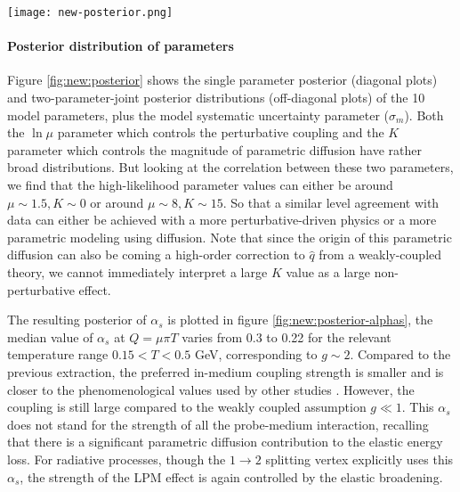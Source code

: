 \begin{figure*}
\centering
\texttt{[image: new-posterior.png]}
\caption[The single-parameter posterior distributions (diagonal plots) and]{The single-parameter posterior distributions (diagonal plots) and two-parameter joint posterior distributions (off-diagonal plots).}
\label{fig:new:posterior}
\end{figure*}

\paragraph{Posterior distribution of parameters} Figure \ref{fig:new:posterior} shows the single parameter posterior (diagonal plots) and two-parameter-joint posterior distributions (off-diagonal plots) of the 10 model parameters, plus the model systematic uncertainty parameter ($\sigma_m$).
Both the $\ln\mu$ parameter which controls the perturbative coupling and the $K$ parameter which controls the magnitude of parametric diffusion have rather broad distributions.
But looking at the correlation between these two parameters, we find that the high-likelihood parameter values can either be around $\mu\sim 1.5, K\sim 0$ or around $\mu\sim 8, K\sim 15$.
So that a similar level agreement with data can either be achieved with a more perturbative-driven physics or a more parametric modeling using diffusion.
Note that since the origin of this parametric diffusion can also be coming a high-order correction to $\hat{q}$ from a weakly-coupled theory, we cannot immediately interpret a large $K$ value as a large non-perturbative effect.

The resulting posterior of $\alpha_s$ is plotted in figure \ref{fig:new:posterior-alphas}, the median value of $\alpha_s$ at $Q=\mu\pi T$ varies from 0.3 to 0.22 for the relevant temperature range $0.15 < T < 0.5$ GeV, corresponding to $g\sim 2$.
Compared to the previous extraction, the preferred in-medium coupling strength is smaller and is closer to the phenomenological values used by other studies \cite{Burke:2013yra}.
However, the coupling is still large compared to the weakly coupled assumption $g\ll 1$.
This $\alpha_s$ does not stand for the strength of all the probe-medium interaction, recalling that there is a significant parametric diffusion contribution to the elastic energy loss.
For radiative processes, though the $1\rightarrow 2$ splitting vertex explicitly uses this $\alpha_s$, the strength of the LPM effect is again controlled by the elastic broadening.


